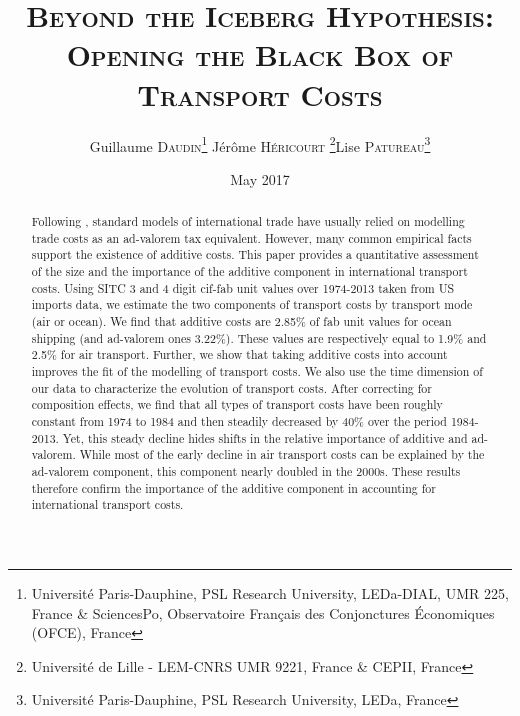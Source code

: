 \documentclass[a4paper,11pt]{article}
\begin{document}
\title{\textsc{Beyond the Iceberg Hypothesis: \\Opening the Black Box of Transport Costs}} %
\author{Guillaume \textsc{Daudin}\thanks{%
Universit\'{e} Paris-Dauphine, PSL Research University, LEDa-DIAL, UMR 225, France \&
SciencesPo, Observatoire Français des Conjonctures \'{E}conomiques (OFCE), France}  \qquad J\'{e}r\^{o}me \textsc{H\'{e}ricourt} \thanks{Universit\'{e} de Lille - LEM-CNRS UMR 9221, France \& CEPII, France}\qquad Lise \textsc{Patureau}\thanks{Universit\'{e} Paris-Dauphine, PSL Research University, LEDa, France } }


\date{May 2017}
 \maketitle
\bigskip

\begin{abstract}
Following \cite{samuelson1954}, standard models of international trade have usually relied on modelling trade costs as an ad-valorem tax equivalent. However, many common empirical facts support the existence of additive costs. This paper provides a quantitative assessment of the size and the importance of the additive component in international transport costs.
Using SITC 3 and 4 digit cif-fab unit values over 1974-2013 taken from US imports data, we estimate the two components of transport costs by transport mode (air or ocean).
We find that additive costs are 2.85\% of fab unit values for ocean shipping (and ad-valorem ones 3.22\%). These values are respectively equal to 1.9\% and 2.5\% for air transport. Further, we show that taking additive costs into account improves the fit of the modelling of transport costs.
We also use the time dimension of our data to characterize the evolution of transport costs. After correcting for composition effects, we find that all types of transport costs have been roughly constant from 1974 to 1984 and then steadily decreased by 40\% over the period 1984-2013. Yet, this steady decline hides shifts in the relative importance of additive and ad-valorem. While most of the early decline in air transport costs can be explained by the ad-valorem component, this component nearly doubled in the 2000s. These results therefore confirm the importance of the additive component in accounting for international transport costs.
\end{abstract}
\end{document}
